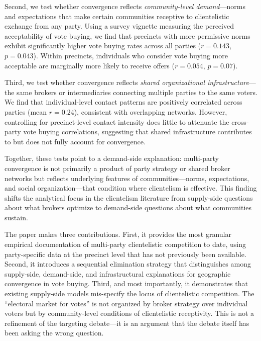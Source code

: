 \documentclass[12pt,letterpaper]{article}
\begin{document}
Second, we test whether convergence reflects \textit{community-level demand}---norms and expectations that make certain communities receptive to clientelistic exchange from any party. Using a survey vignette measuring the perceived acceptability of vote buying, we find that precincts with more permissive norms exhibit significantly higher vote buying rates across all parties ($r = 0.143$, $p = 0.043$). Within precincts, individuals who consider vote buying more acceptable are marginally more likely to receive offers ($r = 0.054$, $p = 0.07$).

Third, we test whether convergence reflects \textit{shared organizational infrastructure}---the same brokers or intermediaries connecting multiple parties to the same voters. We find that individual-level contact patterns are positively correlated across parties (mean $r = 0.24$), consistent with overlapping networks. However, controlling for precinct-level contact intensity does little to attenuate the cross-party vote buying correlations, suggesting that shared infrastructure contributes to but does not fully account for convergence.

Together, these tests point to a demand-side explanation: multi-party convergence is not primarily a product of party strategy or shared broker networks but reflects underlying features of communities---norms, expectations, and social organization---that condition where clientelism is effective. This finding shifts the analytical focus in the clientelism literature from supply-side questions about what brokers optimize to demand-side questions about what communities sustain.

The paper makes three contributions. First, it provides the most granular empirical documentation of multi-party clientelistic competition to date, using party-specific data at the precinct level that has not previously been available. Second, it introduces a sequential elimination strategy that distinguishes among supply-side, demand-side, and infrastructural explanations for geographic convergence in vote buying. Third, and most importantly, it demonstrates that existing supply-side models mis-specify the locus of clientelistic competition. The ``electoral market for votes'' is not organized by broker strategy over individual voters but by community-level conditions of clientelistic receptivity. This is not a refinement of the targeting debate---it is an argument that the debate itself has been asking the wrong question.


\end{document}
